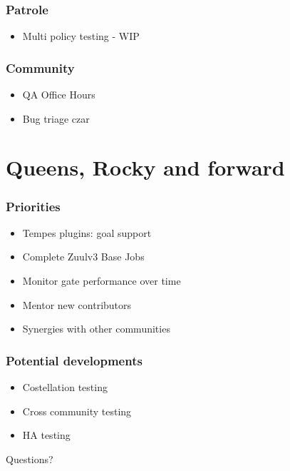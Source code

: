 \documentclass[aspectratio=169,11pt,hyperref={colorlinks=true}]{beamer}
\begin{document}
\begin{frame}
    \frametitle{Patrole}
    \begin{itemize}
        \item{Multi policy testing - WIP}
    \end{itemize}
\end{frame}

\begin{frame}
    \frametitle{Community}
    \begin{itemize}
        \item{QA Office Hours}
        \item{Bug triage czar}
    \end{itemize}
\end{frame}

\section{Queens, Rocky and forward}
\begin{frame}
    \frametitle{Priorities}
    \begin{itemize}
        \item{Tempes plugins: goal support}
	\item{Complete Zuulv3 Base Jobs}
        \item{Monitor gate performance over time}
        \item{Mentor new contributors}
        \item{Synergies with other communities}
    \end{itemize}
\end{frame}

\begin{frame}
    \frametitle{Potential developments}
    \begin{itemize}
        \item{Costellation testing}
        \item{Cross community testing}
        \item{HA testing}
    \end{itemize}
\end{frame}

\begin{frame}[c]
    \begin{center}
        \Huge Questions?
    \end{center}
\end{frame}

\end{document}
